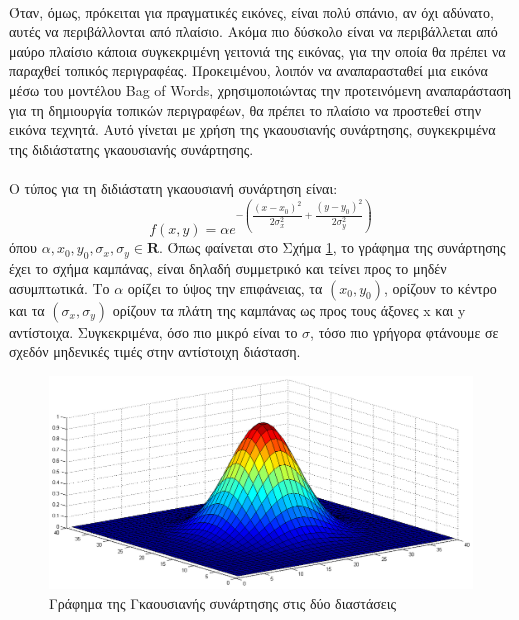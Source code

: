 \paragraph*{}
Όταν, όμως, πρόκειται για πραγματικές εικόνες, είναι πολύ σπάνιο, αν όχι αδύνατο, αυτές να περιβάλλονται από πλαίσιο. Ακόμα πιο δύσκολο είναι να περιβάλλεται από μαύρο πλαίσιο κάποια συγκεκριμένη γειτονιά της εικόνας, για την οποία θα πρέπει να παραχθεί τοπικός περιγραφέας. Προκειμένου, λοιπόν να αναπαρασταθεί μια εικόνα μέσω του μοντέλου Bag of Words, χρησιμοποιώντας την προτεινόμενη αναπαράσταση για τη δημιουργία τοπικών περιγραφέων, θα πρέπει το πλαίσιο να προστεθεί στην εικόνα τεχνητά. Αυτό γίνεται με χρήση της γκαουσιανής συνάρτησης, συγκεκριμένα της διδιάστατης γκαουσιανής συνάρτησης.

\paragraph*{}
Ο τύπος για τη διδιάστατη γκαουσιανή συνάρτηση είναι:
\begin{equation}
f(x,y) = \alpha e^{-\left(\dfrac{(x-x_0)^2}{2\sigma_x^2}+\dfrac{(y-y_0)^2}{2\sigma_y^2}\right)}
\end{equation}
όπου $\alpha, x_0, y_0,\sigma_x, \sigma_y \in \mathbf{R}$. Όπως φαίνεται στο Σχήμα \ref{fig:2dbell}, το γράφημα της συνάρτησης έχει το σχήμα καμπάνας, είναι δηλαδή συμμετρικό και τείνει προς το μηδέν ασυμπτωτικά. Το $\alpha$ ορίζει το ύψος την επιφάνειας, τα $(x_0,y_0)$, ορίζουν το κέντρο και τα $(\sigma_x,\sigma_y)$ ορίζουν τα πλάτη της καμπάνας ως προς τους άξονες x και y αντίστοιχα. Συγκεκριμένα, όσο πιο μικρό είναι το $\sigma$, τόσο πιο γρήγορα φτάνουμε σε σχεδόν μηδενικές τιμές στην αντίστοιχη διάσταση.


\begin{figure}
\centerline{\includegraphics[scale=0.35]{./images/gauss2DCurve.png}}
\caption{Γράφημα της Γκαουσιανής συνάρτησης στις δύο διαστάσεις}
\label{fig:2dbell}
\end{figure}


